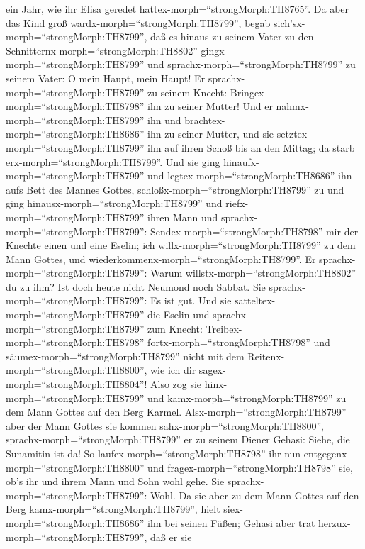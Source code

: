 ein Jahr, wie ihr Elisa geredet hattex-morph=``strongMorph:TH8765''.
 Da aber das Kind groß wardx-morph=``strongMorph:TH8799'',
begab sich'sx-morph=``strongMorph:TH8799'', daß es hinaus zu seinem
Vater zu den Schnitternx-morph=``strongMorph:TH8802''
gingx-morph=``strongMorph:TH8799''  und
sprachx-morph=``strongMorph:TH8799'' zu seinem Vater: O mein Haupt, mein
Haupt! Er sprachx-morph=``strongMorph:TH8799'' zu seinem Knecht:
Bringex-morph=``strongMorph:TH8798'' ihn zu seiner Mutter! 
Und er nahmx-morph=``strongMorph:TH8799'' ihn und
brachtex-morph=``strongMorph:TH8686'' ihn zu seiner Mutter, und sie
setztex-morph=``strongMorph:TH8799'' ihn auf ihren Schoß bis an den
Mittag; da starb erx-morph=``strongMorph:TH8799''.  Und sie
ging hinaufx-morph=``strongMorph:TH8799'' und
legtex-morph=``strongMorph:TH8686'' ihn aufs Bett des Mannes Gottes,
schloßx-morph=``strongMorph:TH8799'' zu und ging
hinausx-morph=``strongMorph:TH8799''  und
riefx-morph=``strongMorph:TH8799'' ihren Mann und
sprachx-morph=``strongMorph:TH8799'':
Sendex-morph=``strongMorph:TH8798'' mir der Knechte einen und eine
Eselin; ich willx-morph=``strongMorph:TH8799'' zu dem Mann Gottes, und
wiederkommenx-morph=``strongMorph:TH8799''.  Er
sprachx-morph=``strongMorph:TH8799'': Warum
willstx-morph=``strongMorph:TH8802'' du zu ihm? Ist doch heute nicht
Neumond noch Sabbat. Sie sprachx-morph=``strongMorph:TH8799'': Es ist
gut.  Und sie satteltex-morph=``strongMorph:TH8799'' die
Eselin und sprachx-morph=``strongMorph:TH8799'' zum Knecht:
Treibex-morph=``strongMorph:TH8798'' fortx-morph=``strongMorph:TH8798''
und säumex-morph=``strongMorph:TH8799'' nicht mit dem
Reitenx-morph=``strongMorph:TH8800'', wie ich dir
sagex-morph=``strongMorph:TH8804''!  Also zog sie
hinx-morph=``strongMorph:TH8799'' und kamx-morph=``strongMorph:TH8799''
zu dem Mann Gottes auf den Berg Karmel.
Alsx-morph=``strongMorph:TH8799'' aber der Mann Gottes sie kommen
sahx-morph=``strongMorph:TH8800'', sprachx-morph=``strongMorph:TH8799''
er zu seinem Diener Gehasi: Siehe, die Sunamitin ist da! 
So laufex-morph=``strongMorph:TH8798'' ihr nun
entgegenx-morph=``strongMorph:TH8800'' und
fragex-morph=``strongMorph:TH8798'' sie, ob's ihr und ihrem Mann und
Sohn wohl gehe. Sie sprachx-morph=``strongMorph:TH8799'': Wohl.
 Da sie aber zu dem Mann Gottes auf den Berg
kamx-morph=``strongMorph:TH8799'', hielt
siex-morph=``strongMorph:TH8686'' ihn bei seinen Füßen; Gehasi aber trat
herzux-morph=``strongMorph:TH8799'', daß er sie
